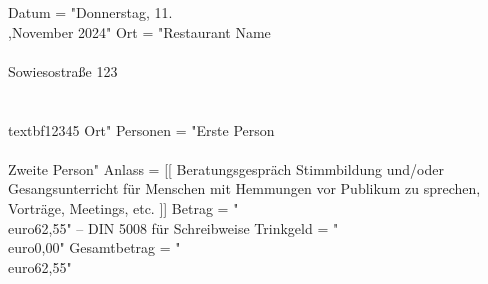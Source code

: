 \documentclass[12pt,a4paper]{scrartcl}
\begin{document}
\begin{luacode}
    Datum = "Donnerstag, 11.\\,November 2024"
    Ort = "Restaurant Name\\\\Sowiesostraße 123\\\\ \\textbf{12345 Ort}"
    Personen = "Erste Person\\\\Zweite Person"
    Anlass = [[
        Beratungsgespräch Stimmbildung und/oder
        Gesangsunterricht für Menschen mit Hemmungen 
        vor Publikum zu sprechen, Vorträge, Meetings, etc.
    ]]
    Betrag = "\\euro{62,55}" -- DIN 5008 für Schreibweise
    Trinkgeld = "\\euro{0,00}"
    Gesamtbetrag = "\\euro{62,55}"
\end{luacode}


\end{document}

